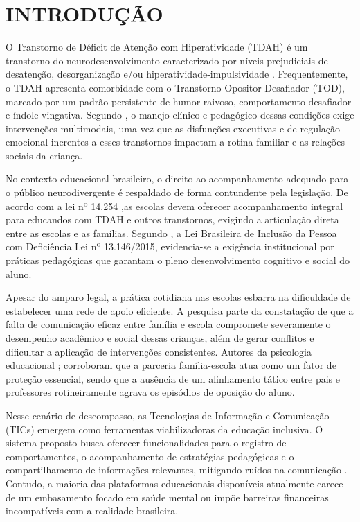 
\chapter{INTRODUÇÃO}
\label{chap:introducao}

O Transtorno de Déficit de Atenção com Hiperatividade (TDAH) é um transtorno do neurodesenvolvimento caracterizado por níveis prejudiciais de desatenção, desorganização e/ou hiperatividade-impulsividade \cite{apa2014}. Frequentemente, o TDAH apresenta comorbidade com o Transtorno Opositor Desafiador (TOD), marcado por um padrão persistente de humor raivoso, comportamento desafiador e índole vingativa. Segundo , o manejo clínico e pedagógico dessas condições exige intervenções multimodais, uma vez que as disfunções executivas e de regulação emocional inerentes a esses transtornos impactam a rotina familiar e as relações sociais da criança.

No contexto educacional brasileiro, o direito ao acompanhamento adequado para o público neurodivergente é respaldado de forma contundente pela legislação. De acordo com a lei nº 14.254 ,as escolas devem oferecer acompanhamento integral para educandos com TDAH e outros transtornos, exigindo a articulação direta entre as escolas e as famílias. Segundo , a Lei Brasileira de Inclusão da Pessoa com Deficiência Lei nº 13.146/2015, evidencia-se a exigência institucional por práticas pedagógicas que garantam o pleno desenvolvimento cognitivo e social do aluno.

Apesar do amparo legal, a prática cotidiana nas escolas esbarra na dificuldade de estabelecer uma rede de apoio eficiente. A pesquisa parte da constatação de que a falta de comunicação eficaz entre família e escola compromete severamente o desempenho acadêmico e social dessas crianças, além de gerar conflitos e dificultar a aplicação de intervenções consistentes. Autores da psicologia educacional \cite{dessen2007}; \cite{epstein2011} corroboram que a parceria família-escola atua como um fator de proteção essencial, sendo que a ausência de um alinhamento tático entre pais e professores rotineiramente agrava os episódios de oposição do aluno.

Nesse cenário de descompasso, as Tecnologias de Informação e Comunicação (TICs) emergem como ferramentas viabilizadoras da educação inclusiva. O sistema proposto busca oferecer funcionalidades para o registro de comportamentos, o acompanhamento de estratégias pedagógicas e o compartilhamento de informações relevantes, mitigando ruídos na comunicação \cite{almeida2018}. Contudo, a maioria das plataformas educacionais disponíveis atualmente carece de um embasamento focado em saúde mental ou impõe barreiras financeiras incompatíveis com a realidade brasileira.

